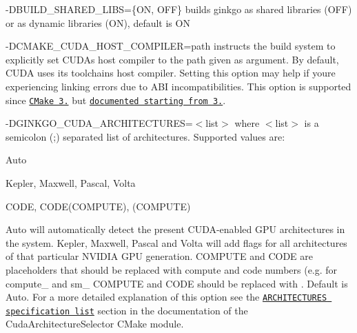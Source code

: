 \begin{DoxyItemize}
\item {\ttfamily -\/\+D\+B\+U\+I\+L\+D\+\_\+\+S\+H\+A\+R\+E\+D\+\_\+\+L\+I\+BS=\{ON, O\+FF\}} builds ginkgo as shared libraries ({\ttfamily O\+FF}) or as dynamic libraries ({\ttfamily ON}), default is {\ttfamily ON}
\item {\ttfamily -\/\+D\+C\+M\+A\+K\+E\+\_\+\+C\+U\+D\+A\+\_\+\+H\+O\+S\+T\+\_\+\+C\+O\+M\+P\+I\+L\+ER=path} instructs the build system to explicitly set C\+U\+DA\textquotesingle{}s host compiler to the path given as argument. By default, C\+U\+DA uses its toolchain\textquotesingle{}s host compiler. Setting this option may help if you\textquotesingle{}re experiencing linking errors due to A\+BI incompatibilities. This option is supported since \href{https://github.com/Kitware/CMake/commit/489c52ce680df6439f9c1e553cd2925ca8944cb1}{\tt C\+Make 3.} but \href{https://cmake.org/cmake/help/v3.10/variable/CMAKE_CUDA_HOST_COMPILER.html}{\tt documented starting from 3.}.
\item {\ttfamily -\/\+D\+G\+I\+N\+K\+G\+O\+\_\+\+C\+U\+D\+A\+\_\+\+A\+R\+C\+H\+I\+T\+E\+C\+T\+U\+R\+ES=$<$list$>$} where {\ttfamily $<$list$>$} is a semicolon ({\ttfamily ;}) separated list of architectures. Supported values are\+:
\begin{DoxyItemize}
\item {\ttfamily Auto}
\item {\ttfamily Kepler}, {\ttfamily Maxwell}, {\ttfamily Pascal}, {\ttfamily Volta}
\item {\ttfamily C\+O\+DE}, {\ttfamily C\+O\+D\+E(\+C\+O\+M\+P\+U\+T\+E)}, {\ttfamily (C\+O\+M\+P\+U\+TE)}
\end{DoxyItemize}

{\ttfamily Auto} will automatically detect the present C\+U\+D\+A-\/enabled G\+PU architectures in the system. {\ttfamily Kepler}, {\ttfamily Maxwell}, {\ttfamily Pascal} and {\ttfamily Volta} will add flags for all architectures of that particular N\+V\+I\+D\+IA G\+PU generation. {\ttfamily C\+O\+M\+P\+U\+TE} and {\ttfamily C\+O\+DE} are placeholders that should be replaced with compute and code numbers (e.\+g. for {\ttfamily compute\+\_} and {\ttfamily sm\+\_} {\ttfamily C\+O\+M\+P\+U\+TE} and {\ttfamily C\+O\+DE} should be replaced with {}. Default is {\ttfamily Auto}. For a more detailed explanation of this option see the \href{https://github.com/ginkgo-project/CudaArchitectureSelector/blob/master/CudaArchitectureSelector.cmake#L58}{\tt {\ttfamily A\+R\+C\+H\+I\+T\+E\+C\+T\+U\+R\+ES} specification list} section in the documentation of the Cuda\+Architecture\+Selector C\+Make module.
\end{DoxyItemize}

